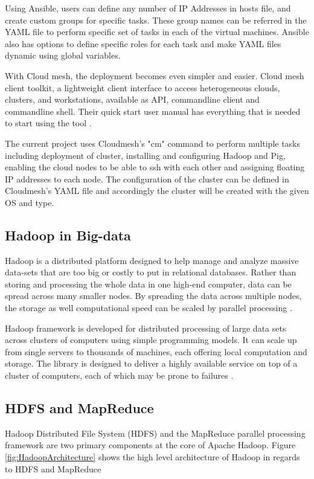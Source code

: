 \documentclass[9pt,twocolumn,twoside]{../../styles/osajnl}
\begin{document}
Using Ansible, users can define any number of IP Addresses in hosts file, and create custom groups for specific tasks. These group names can be referred in the YAML file to perform specific set of tasks in each of the virtual machines. Ansible also has options to define specific roles for each task and make YAML files dynamic using global variables.

With Cloud mesh, the deployment becomes even simpler and easier. Cloud mesh client toolkit, a lightweight client interface to access heterogeneous clouds, clusters, and workstations, available as API, commandline client and commandline shell. Their quick start user manual has everything that is needed to start using the tool \cite{www-cm-docs}.

The current project uses Cloudmesh's "cm" command to perform multiple tasks including deployment of cluster, installing and configuring Hadoop and Pig, enabling the cloud nodes to be able to ssh with each other and assigning floating IP addresses to each node. The configuration of the cluster can be defined in Cloudmesh's YAML file and accordingly the cluster will be created with the given OS and type.

\subsection{Hadoop in Big-data}
Hadoop is a distributed platform designed to help manage and analyze massive data-sets that are too big or costly to put in relational databases. Rather than storing and processing the whole data in one high-end computer, data can be spread across many smaller nodes. By spreading the data across multiple nodes, the storage as well computational speed can be scaled by parallel processing \cite{www-thinkbig}.

Hadoop framework is developed for distributed processing of large data sets across clusters of computers using simple programming models. It can scale up from single servers to thousands of machines, each offering local computation and storage. The library is designed to deliver a highly available service on top of a cluster of computers, each of which may be prone to failures \cite{www-readwrite}.

\subsection{HDFS and MapReduce}
Hadoop Distributed File System (HDFS) and the MapReduce parallel processing framework are two primary components at the core of Apache Hadoop. Figure \ref{fig:HadoopArchitecture} shows the high level architecture of Hadoop in regards to HDFS and MapReduce 
\end{document}
